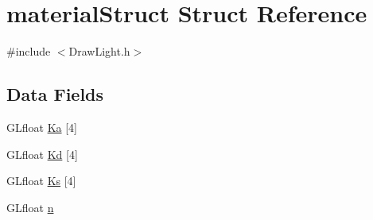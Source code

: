 \hypertarget{structmaterial_struct}{\section{material\-Struct Struct Reference}
\label{structmaterial_struct}
}


{\ttfamily \#include $<$Draw\-Light.\-h$>$}

\subsection*{Data Fields}
\begin{DoxyCompactItemize}
\item 
G\-Lfloat \hyperlink{structmaterial_struct_a8938ed07909242f433e3c469ec08ecf4}{Ka} \mbox{[}4\mbox{]}
\item 
G\-Lfloat \hyperlink{structmaterial_struct_a83cf9cdeaf839d8efb4300e303bcae3a}{Kd} \mbox{[}4\mbox{]}
\item 
G\-Lfloat \hyperlink{structmaterial_struct_a73f521d42656a51d63698b9fb6b7afaa}{Ks} \mbox{[}4\mbox{]}
\item 
G\-Lfloat \hyperlink{structmaterial_struct_afeb08cec27be22b9750519cf67fbdb62}{n}
\end{DoxyCompactItemize}



